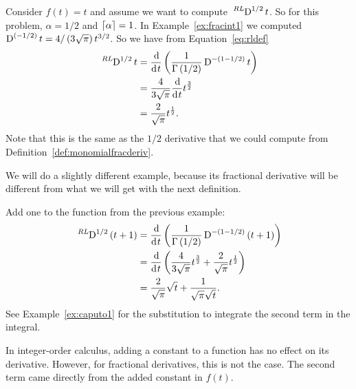     \begin{example}
      Consider $f(t) = t$ and assume we want to compute $\tensor*[^{RL}]{\D}{^{1/2}}t$. So for this problem, $\alpha = 1/2$
      and $\left\lceil \alpha \right\rceil = 1$.  In Example~\ref{ex:fracint1} we computed $\tensor*[]{\D}{^{(-1/2)}}t=4/\left(3 \sqrt{\pi}\right)
      t^{3/2}$. So we have from Equation~\ref{eq:rldef}
      \begin{align*}
	\tensor*[^{RL}]{\D}{^{1/2}} t &= \frac{\d}{\d t} \left( \frac{1}{\Gamma \left( 1/2 \right)} \tensor*[]{\D}{^{-(1-1/2)}} t\right)
	\\
	&=  \frac{4}{3 \sqrt{\pi}} \frac{\d}{\d t} t^\frac{3}{2} \\
	&= \frac{2}{\sqrt{\pi}} t^\frac{1}{2}.
      \end{align*}
      Note that this is the same as the $1/2$ derivative that we could compute from Definition~\ref{def:monomialfracderiv}.
      \label{ex:fracderiv1}
    \end{example}

    We will do a slightly different example, because its fractional derivative will be different from what we will get with
    the next definition.

    \begin{example}
      Add one to the function from the previous example:
      \begin{align*}
	\tensor*[^{RL}]{\D}{^{1/2}} \left( t + 1 \right) &= \frac{\d}{\d t} \left( \frac{1}{\Gamma \left( 1/2 \right)} \tensor*[]{\D}{^{-(1-1/2)}} \left( t + 1 \right) \right) \\
	&=  \frac{\d}{\d t} \left( \frac{4}{3 \sqrt{\pi}} t^\frac{3}{2} +  \frac{2}{\sqrt{\pi}} t^\frac{1}{2} \right)\\
	&= \frac{2}{\sqrt{\pi}} \sqrt{t} + \frac{1}{\sqrt{\pi} \sqrt{t}}. 
      \end{align*}
      See Example~\ref{ex:caputo1} for the substitution to integrate the second term in the integral.

      In integer-order calculus, adding a constant to a function has no effect on its derivative. However, for fractional derivatives, this is not the case. The second term came directly from the added constant in $f(t)$.       \label{ex:fracderiv2}
    \end{example}


